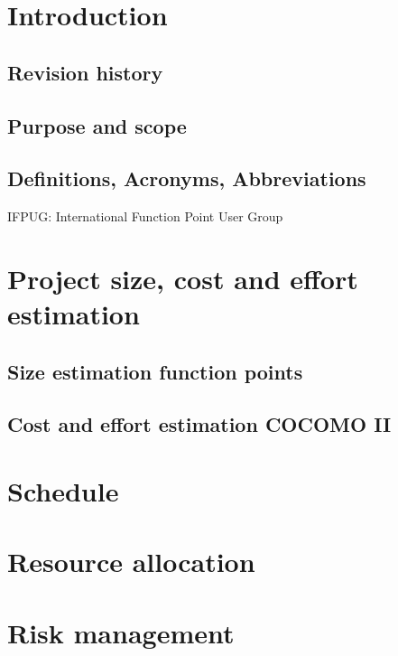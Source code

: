 \section{Introduction}
\subsection{Revision history}
\subsection{Purpose and scope}
\subsection{Definitions, Acronyms, Abbreviations}
IFPUG: International Function Point User Group

\clearpage
\section{Project size, cost and effort estimation}
\subsection{Size estimation function points}


\subsection{Cost and effort estimation COCOMO II}

\clearpage
\section{Schedule}

\clearpage
\section{Resource allocation}

\clearpage
\section{Risk management}